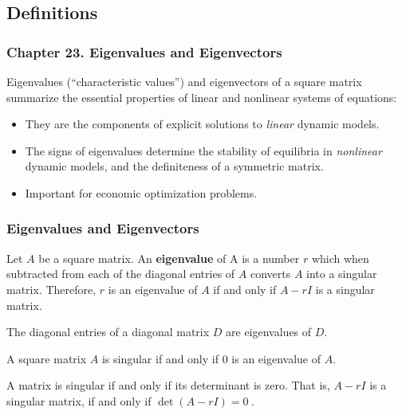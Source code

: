 \documentclass[10pt, handout]{beamer}
\begin{document}
\subsection{Definitions}
\begin{frame}
\frametitle{Chapter 23. Eigenvalues and Eigenvectors} \vskip 0.1in

Eigenvalues (``characteristic values'') and eigenvectors of a square matrix summarize the essential properties of linear and nonlinear systems of equations:
\begin{itemize}
\item They are the components of explicit solutions to \textit{linear} dynamic models.
\item The signs of eigenvalues determine the stability of equilibria in \textit{nonlinear} dynamic models, and the definiteness of a symmetric matrix.
\item Important for economic optimization problems.
\end{itemize}

\end{frame}




\begin{frame}
\frametitle{Eigenvalues and Eigenvectors} \vskip 0.1in

\begin{example}[See 23.1, 23.2, 23.3, \& 23.4., pp. 580-1]
\end{example}

\begin{definition}
Let $A$ be a square matrix. An \textbf{eigenvalue} of A is a number $r$ which when subtracted from each of the  diagonal entries of $A$ converts $A$ into a singular matrix. Therefore, $r$ is an eigenvalue of $A$ if and only if $ A - rI $ is a singular matrix.
\end{definition}


\begin{theorem}[23.1]
The diagonal entries of a diagonal matrix $D$ are eigenvalues of $D$.
\end{theorem}

\begin{theorem}[23.2]
A square matrix $A$ is singular if and only if 0 is an eigenvalue of $A$.
\end{theorem}

A matrix is singular if and only if its determinant is zero. That is, $ A - rI $ is a singular matrix, if and only if $\label{deter} \det (A - r I) = 0 ~.$

\end{frame}
\end{document}
